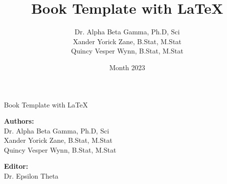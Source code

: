 \documentclass[a5paper,11pt]{book}
\begin{document}
\author{Dr. Alpha Beta Gamma, Ph.D, Sci \\ 
	Xander Yorick Zane, B.Stat, M.Stat \\
	Quincy Vesper Wynn, B.Stat, M.Stat
}
\title{Book Template with \LaTeX}
\date{Month 2023}

\frontmatter
{}
\newcommand{\editors}[1]{%
	\newcommand{\inserteditors}{#1}
}

\editors{Dr. Epsilon Theta}
	
\begin{titlepage}
	\centering
	\vspace*{1cm}
	
	{\Huge Book Template with \LaTeX}
	
	\vspace{2cm}
	\textbf{Authors:}\\
	Dr. Alpha Beta Gamma, Ph.D, Sci \\
	Xander Yorick Zane, B.Stat, M.Stat \\
	Quincy Vesper Wynn, B.Stat, M.Stat
	
	\vspace{1cm}
	\textbf{Editor:}\\
	\inserteditors
\end{titlepage}
\restoregeometry




\setcounter{lastfrontmatterpage}{\value{page}}

\mainmatter





\backmatter
{}
\setcounter{page}{\value{lastfrontmatterpage}}
\newpage

\pagestyle{plain}



\newpage


\end{document}
